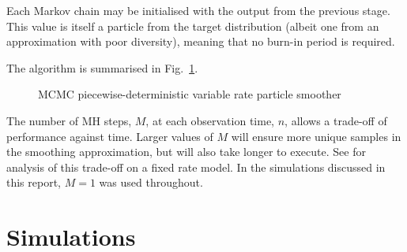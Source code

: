 \documentclass[journal]{IEEEtran}
\begin{document}
Each Markov chain may be initialised with the output from the previous stage. This value is itself a particle from the target distribution (albeit one from an approximation with poor diversity), meaning that no burn-in period is required.

The algorithm is summarised in Fig.~\ref{alg:VRPS}.

\begin{figure}
\caption{MCMC piecewise-deterministic variable rate particle smoother}
\label{alg:VRPS}
\end{figure}

The number of MH steps, $M$, at each observation time, $n$, allows a trade-off of performance against time. Larger values of $M$ will ensure more unique samples in the smoothing approximation, but will also take longer to execute. See \cite{Bunch2012} for analysis of this trade-off on a fixed rate model. In the simulations discussed in this report, $M=1$ was used throughout.



\section{Simulations} \label{sec:simulations}
\end{document}

